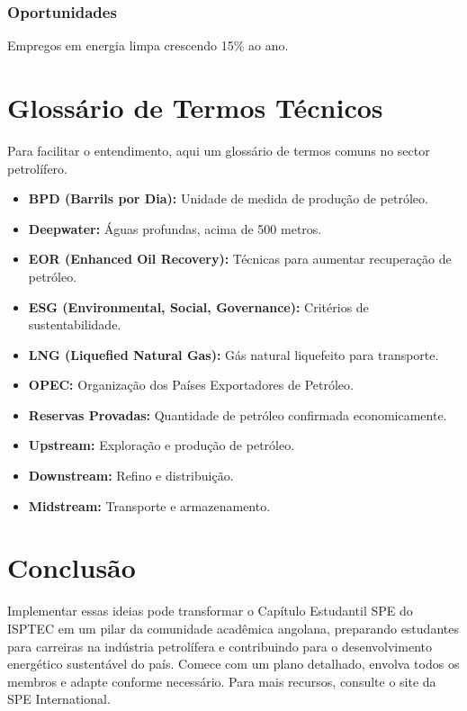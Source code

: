 \documentclass[12pt]{article}
\begin{document}
\subsubsection{Oportunidades}
Empregos em energia limpa crescendo 15\% ao ano.

\section{Glossário de Termos Técnicos}

Para facilitar o entendimento, aqui um glossário de termos comuns no sector petrolífero.

\begin{itemize}
    \item \textbf{BPD (Barrils por Dia):} Unidade de medida de produção de petróleo.
    \item \textbf{Deepwater:} Águas profundas, acima de 500 metros.
    \item \textbf{EOR (Enhanced Oil Recovery):} Técnicas para aumentar recuperação de petróleo.
    \item \textbf{ESG (Environmental, Social, Governance):} Critérios de sustentabilidade.
    \item \textbf{LNG (Liquefied Natural Gas):} Gás natural liquefeito para transporte.
    \item \textbf{OPEC:} Organização dos Países Exportadores de Petróleo.
    \item \textbf{Reservas Provadas:} Quantidade de petróleo confirmada economicamente.
    \item \textbf{Upstream:} Exploração e produção de petróleo.
    \item \textbf{Downstream:} Refino e distribuição.
    \item \textbf{Midstream:} Transporte e armazenamento.
\end{itemize}

\section{Conclusão}

Implementar essas ideias pode transformar o Capítulo Estudantil SPE do ISPTEC em um pilar da comunidade acadêmica angolana, preparando estudantes para carreiras na indústria petrolífera e contribuindo para o desenvolvimento energético sustentável do país. Comece com um plano detalhado, envolva todos os membros e adapte conforme necessário. Para mais recursos, consulte o site da SPE International.
\end{document}
